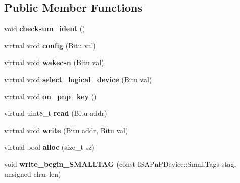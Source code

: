 \subsection*{Public Member Functions}
\begin{DoxyCompactItemize}
\item 
\hypertarget{classISAPnPDevice_a948afe92ba459a86c0fbc57812b139d5}{void {\bfseries checksum\-\_\-ident} ()}\label{classISAPnPDevice_a948afe92ba459a86c0fbc57812b139d5}

\item 
\hypertarget{classISAPnPDevice_a3d83390d27f0382f7a7f9aeae8d36e89}{virtual void {\bfseries config} (Bitu val)}\label{classISAPnPDevice_a3d83390d27f0382f7a7f9aeae8d36e89}

\item 
\hypertarget{classISAPnPDevice_a596ca247bdc0c23ad01ab84abfdfee03}{virtual void {\bfseries wakecsn} (Bitu val)}\label{classISAPnPDevice_a596ca247bdc0c23ad01ab84abfdfee03}

\item 
\hypertarget{classISAPnPDevice_a1eff8e26d19e549854832caffe881544}{virtual void {\bfseries select\-\_\-logical\-\_\-device} (Bitu val)}\label{classISAPnPDevice_a1eff8e26d19e549854832caffe881544}

\item 
\hypertarget{classISAPnPDevice_a7ef60a94b9a22392cc26be2b85fec047}{virtual void {\bfseries on\-\_\-pnp\-\_\-key} ()}\label{classISAPnPDevice_a7ef60a94b9a22392cc26be2b85fec047}

\item 
\hypertarget{classISAPnPDevice_ac08ba398c7845074a80602a60b5d64ec}{virtual uint8\-\_\-t {\bfseries read} (Bitu addr)}\label{classISAPnPDevice_ac08ba398c7845074a80602a60b5d64ec}

\item 
\hypertarget{classISAPnPDevice_adb4e289227c64c9be96933dddf92e904}{virtual void {\bfseries write} (Bitu addr, Bitu val)}\label{classISAPnPDevice_adb4e289227c64c9be96933dddf92e904}

\item 
\hypertarget{classISAPnPDevice_ac73f006fe93881e217713ba0a2fc3c73}{virtual bool {\bfseries alloc} (size\-\_\-t sz)}\label{classISAPnPDevice_ac73f006fe93881e217713ba0a2fc3c73}

\item 
\hypertarget{classISAPnPDevice_aa9773b4ff25b7177fd1cd4fd2fa25a6b}{void {\bfseries write\-\_\-begin\-\_\-\-S\-M\-A\-L\-L\-T\-A\-G} (const I\-S\-A\-Pn\-P\-Device\-::\-Small\-Tags stag, unsigned char len)}\label{classISAPnPDevice_aa9773b4ff25b7177fd1cd4fd2fa25a6b}


\end{DoxyCompactItemize}
